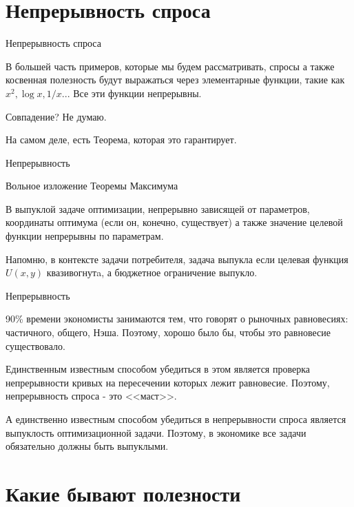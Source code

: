 \documentclass{beamer}
\begin{document}
\section{Непрерывность спроса}

\begin{frame}{Непрерывность спроса}

В большей часть примеров, которые мы будем рассматривать, спросы а также косвенная полезность будут выражаться через элементарные функции, такие как $x^2, \log x, 1/x$... Все эти функции непрерывны. 

Совпадение? Не думаю.

На самом деле, есть Теорема, которая это гарантирует.

\end{frame}

\begin{frame}{Непрерывность}

Вольное изложение Теоремы Максимума

\alert{В выпуклой задаче оптимизации, непрерывно зависящей от параметров, координаты оптимума (если он, конечно, существует) а также значение целевой функции непрерывны по параметрам.}

Напомню, в контексте задачи потребителя, задача выпукла если целевая функция $U(x,y)$ квазивогнутa, а бюджетное ограничение выпукло.

\end{frame}

\begin{frame}{Непрерывность}

90\% времени экономисты занимаются тем, что говорят о рыночных равновесиях: частичного, общего, Нэша. Поэтому, \alert{хорошо было бы, чтобы это равновесие существовало.}

Единственным известным способом убедиться в этом является проверка непрерывности кривых на пересечении которых лежит равновесие. Поэтому, непрерывность спроса - это <<маст>>.

А единственно известным способом убедиться в непрерывности спроса является выпуклость оптимизационной задачи. Поэтому, \alert{в экономике все задачи обязательно должны быть выпуклыми.}

\end{frame}

\section{Какие бывают полезности}
\end{document}
